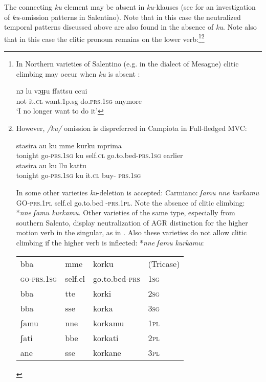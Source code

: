 \documentclass[output=paper]{langscibook}
\begin{document}
The connecting \textit{ku} element may be absent in \textit{ku}-klauses (see \citet{ledgeway2015a} for an investigation of \textit{ku}-omission patterns in Salentino).  Note that in this case the neutralized temporal patterns discussed above are also found in the absence of \textit{ku}. Note also that in this case the clitic pronoun remains on the lower verb:\footnote{In Northern varieties of Salentino (e.g. in the dialect of Mesagne) clitic climbing may occur when \textit{ku} is absent \citep{calabrese1993a, terzi1992a, terzi1994a, terzi1996a}:

\ea \label{fn8ex}\gll nɔ  lu  vɔɟɟu  ffattsu   ccui    \\
 not it.\textsc{cl}  want.1p.sg  do.\textsc{prs}.\textsc{1sg}  anymore\\
 \glt `I no longer want to do it’
\z

}\footnote{However, \textit{/ku/} omission is dispreferred in Campiota in Full-fledged MVC:

\ea \label{fn9ex}
    \ea \label{fn9exa} \gll stasira au      ku  mme    kurku       mprima\\
     tonight go-\textsc{prs}.\textsc{1sg}  ku self.\textsc{cl}  go.to.bed-\textsc{prs}.\textsc{1sg}  earlier\\
    \ex \label{fn9exb}\gll stasira  au       ku  llu   kattu\\
   tonight  go-\textsc{prs}.\textsc{1sg}  ku  it.\textsc{cl} buy- \textsc{prs}.\textsc{1sg} \\
    \z
\ex \label{fn9ex2}
    \z
\z

In some other varieties \textit{ku}-deletion is accepted:  Carmiano: \textit{ʃamu nne kurkamu} GO-\textsc{prs}.\textsc{1pl} self.cl   go.to.bed -\textsc{prs}.\textsc{1pl}. Note the absence of clitic climbing:  *\textit{nne ʃamu kurkamu}.  Other varieties of the same type, especially from southern Salento, display neutralization of AGR distinction for the higher motion verb in the singular, as in .  Also these varieties do not allow clitic climbing if the higher verb is inflected: *\textit{nne ʃamu kurkamu}:

\ea \label{fn9ex3}
\begin{tabular}[t]{@{}llll@{}}
bba        & mme     & korku             & (Tricase) \\
\textsc{go-prs.1sg} & self.cl & go.to.bed-\textsc{prs} & \textsc{1sg}\\
bba        & tte     & korki             & \textsc{2sg}\\
bba        & sse     & korka             & \textsc{3sg}\\
ʃamu       & nne     & korkamu           & \textsc{1pl}\\
ʃati       & bbe     & korkati           & \textsc{2pl}\\
ane        & sse     & korkane           & \textsc{3pl}
\end{tabular}
\z}
\end{document}

